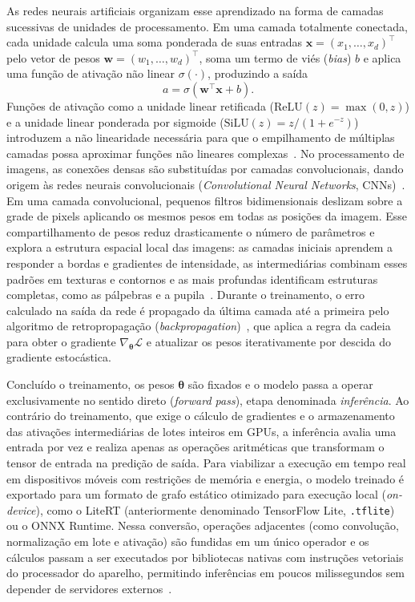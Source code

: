 As redes neurais artificiais organizam esse aprendizado na forma de camadas sucessivas de unidades de processamento. Em uma camada totalmente conectada, cada unidade calcula uma soma ponderada de suas entradas $\mathbf{x} = (x_1, \ldots, x_d)^\top$ pelo vetor de pesos $\mathbf{w} = (w_1, \ldots, w_d)^\top$, soma um termo de viés (\textit{bias}) $b$ e aplica uma função de ativação não linear $\sigma(\cdot)$, produzindo a saída
\begin{equation}
    a = \sigma(\mathbf{w}^\top \mathbf{x} + b).
    \label{eq:neuronio}
\end{equation}
Funções de ativação como a unidade linear retificada ($\mathrm{ReLU}(z) = \max(0, z)$) e a unidade linear ponderada por sigmoide ($\mathrm{SiLU}(z) = z / (1 + e^{-z})$) introduzem a não linearidade necessária para que o empilhamento de múltiplas camadas possa aproximar funções não lineares complexas~\cite{lecun2015deep,goodfellow2016deep}. No processamento de imagens, as conexões densas são substituídas por camadas convolucionais, dando origem às redes neurais convolucionais (\textit{Convolutional Neural Networks}, CNNs)~\cite{lecun2015deep}. Em uma camada convolucional, pequenos filtros bidimensionais deslizam sobre a grade de pixels aplicando os mesmos pesos em todas as posições da imagem. Esse compartilhamento de pesos reduz drasticamente o número de parâmetros e explora a estrutura espacial local das imagens: as camadas iniciais aprendem a responder a bordas e gradientes de intensidade, as intermediárias combinam esses padrões em texturas e contornos e as mais profundas identificam estruturas completas, como as pálpebras e a pupila~\cite{lecun2015deep}. Durante o treinamento, o erro calculado na saída da rede é propagado da última camada até a primeira pelo algoritmo de retropropagação (\textit{backpropagation})~\cite{rumelhart1986learning}, que aplica a regra da cadeia para obter o gradiente $\nabla_{\boldsymbol{\theta}} \mathcal{L}$ e atualizar os pesos iterativamente por descida do gradiente estocástica.

Concluído o treinamento, os pesos $\boldsymbol{\theta}$ são fixados e o modelo passa a operar exclusivamente no sentido direto (\textit{forward pass}), etapa denominada \textit{inferência}. Ao contrário do treinamento, que exige o cálculo de gradientes e o armazenamento das ativações intermediárias de lotes inteiros em GPUs, a inferência avalia uma entrada por vez e realiza apenas as operações aritméticas que transformam o tensor de entrada na predição de saída. Para viabilizar a execução em tempo real em dispositivos móveis com restrições de memória e energia, o modelo treinado é exportado para um formato de grafo estático otimizado para execução local (\textit{on-device}), como o LiteRT (anteriormente denominado TensorFlow Lite, \texttt{.tflite})~\cite{tflite_docs} ou o ONNX Runtime. Nessa conversão, operações adjacentes (como convolução, normalização em lote e ativação) são fundidas em um único operador e os cálculos passam a ser executados por bibliotecas nativas com instruções vetoriais do processador do aparelho, permitindo inferências em poucos milissegundos sem depender de servidores externos~\cite{tflite_docs}.

